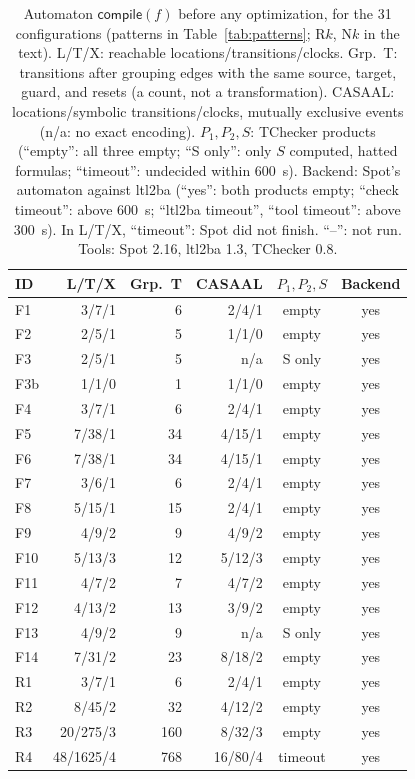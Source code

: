 \begin{table}[t]
\centering
\caption{Automaton $\mathsf{compile}(f)$ before any optimization, for the 31 configurations (patterns in Table~\ref{tab:patterns}; R$k$, N$k$ in the text). L/T/X: reachable locations/transitions/clocks. Grp.\ T: transitions after grouping edges with the same source, target, guard, and resets (a count, not a transformation). CASAAL: locations/symbolic transitions/clocks, mutually exclusive events (n/a: no exact encoding). $P_1,P_2,S$: TChecker products (``empty'': all three empty; ``S only'': only $S$ computed, hatted formulas; ``timeout'': undecided within 600~s). Backend: Spot's automaton against ltl2ba (``yes'': both products empty; ``check timeout'': above 600~s; ``ltl2ba timeout'', ``tool timeout'': above 300~s). In L/T/X, ``timeout'': Spot did not finish. ``--'': not run. Tools: Spot 2.16, ltl2ba 1.3, TChecker 0.8.}
\label{tab:compiled}
\scriptsize
\setlength{\tabcolsep}{3pt}
\begin{tabular}{@{}lrrrcc@{}}
\toprule
ID & L/T/X & Grp.\ T & CASAAL & $P_1,P_2,S$ & Backend\\
\midrule
F1 & 3/7/1 & 6 & 2/4/1 & empty & yes\\
F2 & 2/5/1 & 5 & 1/1/0 & empty & yes\\
F3 & 2/5/1 & 5 & n/a & S only & yes\\
F3b & 1/1/0 & 1 & 1/1/0 & empty & yes\\
F4 & 3/7/1 & 6 & 2/4/1 & empty & yes\\
F5 & 7/38/1 & 34 & 4/15/1 & empty & yes\\
F6 & 7/38/1 & 34 & 4/15/1 & empty & yes\\
F7 & 3/6/1 & 6 & 2/4/1 & empty & yes\\
F8 & 5/15/1 & 15 & 2/4/1 & empty & yes\\
F9 & 4/9/2 & 9 & 4/9/2 & empty & yes\\
F10 & 5/13/3 & 12 & 5/12/3 & empty & yes\\
F11 & 4/7/2 & 7 & 4/7/2 & empty & yes\\
F12 & 4/13/2 & 13 & 3/9/2 & empty & yes\\
F13 & 4/9/2 & 9 & n/a & S only & yes\\
F14 & 7/31/2 & 23 & 8/18/2 & empty & yes\\
R1 & 3/7/1 & 6 & 2/4/1 & empty & yes\\
R2 & 8/45/2 & 32 & 4/12/2 & empty & yes\\
R3 & 20/275/3 & 160 & 8/32/3 & empty & yes\\
R4 & 48/1625/4 & 768 & 16/80/4 & timeout & yes\\

\end{tabular}
\end{table}
